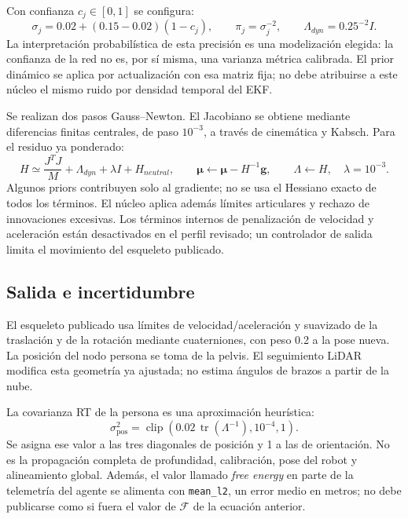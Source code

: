 \documentclass[11pt,a4paper]{article}
\newcommand{\code}[1]{\nolinkurl{#1}}
\newcommand{\clip}{\operatorname{clip}}
\begin{document}
Con confianza $c_j\in[0,1]$ se configura:
\begin{equation}
 \sigma_j=0.02+(0.15-0.02)(1-c_j),\qquad \pi_j=\sigma_j^{-2},
 \qquad \Lambda_{dyn}=0.25^{-2}I.
\end{equation}
La interpretación probabilística de esta precisión es una modelización elegida:
la confianza de la red no es, por sí misma, una varianza métrica calibrada. El prior
dinámico se aplica por actualización con esa matriz fija; no debe atribuirse a este
núcleo el mismo ruido por densidad temporal del EKF.~\cite{humanconfig,vfe}

Se realizan dos pasos Gauss--Newton. El Jacobiano se obtiene mediante diferencias
finitas centrales, de paso $10^{-3}$, a través de cinemática y Kabsch. Para el
residuo ya ponderado:
\begin{equation}
 H\simeq \frac{J^TJ}{M}+\Lambda_{dyn}+\lambda I+H_{neutral},\qquad
 \bm{\mu}\leftarrow\bm{\mu}-H^{-1}\bm{g},\qquad \Lambda\leftarrow H,
 \quad\lambda=10^{-3}.
\end{equation}
Algunos priors contribuyen solo al gradiente; no se usa el Hessiano exacto de todos
los términos. El núcleo aplica además límites articulares y rechazo de innovaciones
excesivas. Los términos internos de penalización de velocidad y aceleración están
desactivados en el perfil revisado; un controlador de salida limita el movimiento
del esqueleto publicado.~\cite{vfe,humanconfig,humanfitter}

\subsection{Salida e incertidumbre}
El esqueleto publicado usa límites de velocidad/aceleración y suavizado de la
traslación y de la rotación mediante cuaterniones, con peso 0.2 a la pose nueva.
La posición del nodo persona se toma de la pelvis. El seguimiento LiDAR modifica
esta geometría ya ajustada; no estima ángulos de brazos a partir de la nube.
\cite{humanfitter,humangraph,humanlidar}

La covarianza RT de la persona es una aproximación heurística:
\begin{equation}
 \sigma^2_{\mathrm{pos}}=\clip(0.02\,\operatorname{tr}(\Lambda^{-1}),10^{-4},1).
\end{equation}
Se asigna ese valor a las tres diagonales de posición y 1 a las de orientación.
No es la propagación completa de profundidad, calibración, pose del robot y
alineamiento global. Además, el valor llamado \emph{free energy} en parte de la
telemetría del agente se alimenta con \code{mean_l2}, un error medio en metros;
no debe publicarse como si fuera el valor de $\mathcal{F}$ de la ecuación anterior.
\cite{humangraph,humanfitter}
\end{document}
